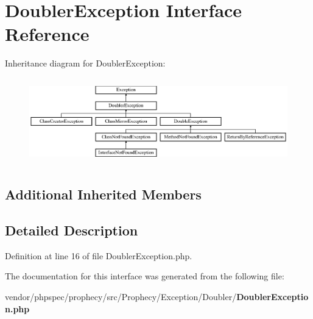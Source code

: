 \section{Doubler\+Exception Interface Reference}
\label{interface_prophecy_1_1_exception_1_1_doubler_1_1_doubler_exception}
Inheritance diagram for Doubler\+Exception\+:\begin{figure}[H]
\begin{center}
\leavevmode
\includegraphics[height=3.763441cm]{interface_prophecy_1_1_exception_1_1_doubler_1_1_doubler_exception}
\end{center}
\end{figure}
\subsection*{Additional Inherited Members}


\subsection{Detailed Description}


Definition at line 16 of file Doubler\+Exception.\+php.



The documentation for this interface was generated from the following file\+:\begin{DoxyCompactItemize}
\item 
vendor/phpspec/prophecy/src/\+Prophecy/\+Exception/\+Doubler/{\bf Doubler\+Exception.\+php}\end{DoxyCompactItemize}
